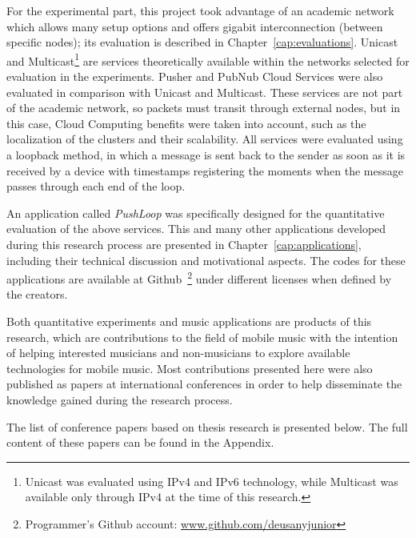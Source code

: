 For the experimental part, this project took advantage of an academic network which allows many setup options and offers gigabit interconnection (between specific nodes); its evaluation is described in Chapter~\ref{cap:evaluations}.
Unicast and Multicast\footnote{Unicast was evaluated using IPv4 and IPv6 technology, while Multicast was available only through IPv4 at the time of this research.} are services theoretically available within the networks selected for evaluation in the experiments.
Pusher and PubNub Cloud Services were also evaluated in comparison with Unicast and Multicast.
These services are not part of the academic network, so packets must transit through external nodes, but in this case, Cloud Computing benefits were taken into account, such as the localization of the clusters and their scalability.
All services were evaluated using a loopback method, in which a message is sent back to the sender as soon as it is received by a device with timestamps registering the moments when the message passes through each end of the loop.

An application called \textit{PushLoop} was specifically designed for the quantitative evaluation of the above services.
This and many other applications developed during this research process are presented in Chapter~\ref{cap:applications}, including their technical discussion and motivational aspects.
The codes for these applications are available at Github~\footnote{Programmer's Github account: \url{www.github.com/deusanyjunior}} under different licenses when defined by the creators.

Both quantitative experiments and music applications are products of this research, which are contributions to the field of mobile music with the intention of helping interested musicians and non-musicians to explore available technologies for mobile music.
Most contributions presented here were also published as papers at international conferences in order to help disseminate the knowledge gained during the research process.

The list of conference papers based on thesis research is presented below.
The full content of these papers can be found in the Appendix.

